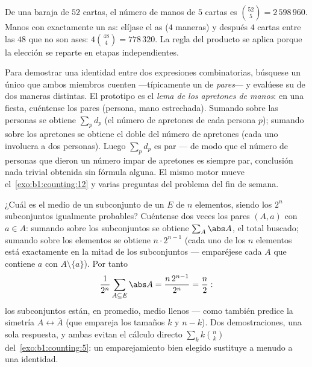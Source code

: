 \begin{example}\label{ex:b1:counting:poker}
De una baraja de $52$ cartas, el número de manos de $5$ cartas es
$\binom{52}{5} = 2\,598\,960$. Manos con exactamente un as: elíjase el
as ($4$ maneras) y después $4$ cartas entre las $48$ que no son ases:
$4 \binom{48}{4} = 778\,320$. La regla del producto se aplica porque la
elección se reparte en etapas independientes.
\end{example}

\begin{method}\label{met:b1:counting:doublecount}
Para demostrar una identidad entre dos expresiones combinatorias,
búsquese un único  que ambos miembros cuenten
---típicamente un  de \emph{pares}--- y evalúese su
 de dos maneras distintas. El prototipo es el \emph{lema de
los apretones de manos}: en una fiesta, cuéntense los pares (persona,
mano estrechada). Sumando sobre las personas se obtiene $\sum_p d_p$
(el número de apretones de cada persona $p$); sumando sobre los
apretones se obtiene el doble del número de apretones (cada uno
involucra a dos personas). Luego $\sum_p d_p$ es par --- de modo que el
número de personas que dieron un número impar de apretones es siempre
par, conclusión nada trivial obtenida sin fórmula alguna. El mismo
motor mueve el~\cref{exo:b1:counting:12} y varias preguntas del
problema del fin de semana.
\end{method}

\begin{example}\label{ex:b1:counting:averagesubset}
¿Cuál es el  medio de un subconjunto de un  $E$ de $n$
elementos, siendo los $2^n$ subconjuntos igualmente probables? Cuéntense
dos veces los pares $(A, a)$ con $a \in A$: sumando sobre los
subconjuntos se obtiene $\sum_A \abs A$, el total buscado; sumando sobre
los elementos se obtiene $n \cdot 2^{n-1}$ (cada uno de los $n$
elementos está exactamente en la mitad de los subconjuntos ---
emparéjese cada $A$ que contiene $a$ con $A \setminus \{a\}$). Por tanto
\[
\frac{1}{2^n}\sum_{A \subseteq E} \abs A
= \frac{n\,2^{n-1}}{2^n} = \frac n2 :
\]
los subconjuntos están, en promedio, medio llenos --- como también
predice la simetría $A \leftrightarrow \overline A$ (que empareja los
tamaños $k$ y $n - k$). Dos demostraciones, una sola respuesta, y ambas
evitan el cálculo directo $\sum_k k\binom nk$
del~\cref{exo:b1:counting:5}: un emparejamiento bien elegido sustituye a
menudo a una identidad.
\end{example}

